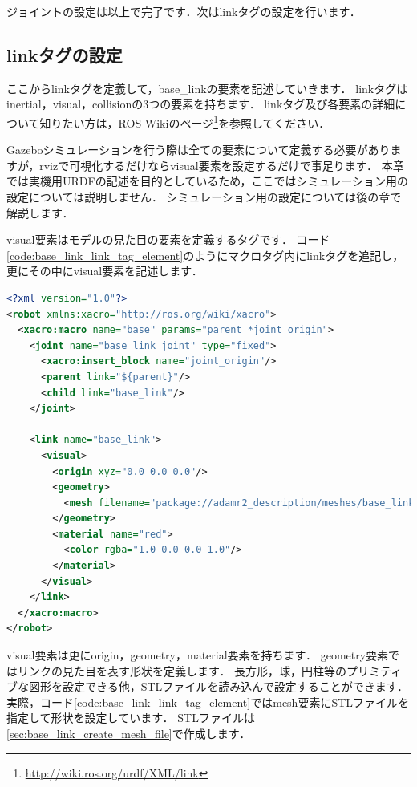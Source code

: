 \documentclass[{../../master}]{subfiles}
\begin{document}
ジョイントの設定は以上で完了です．次は\textsf{link}タグの設定を行います．

\subsection{\textsf{link}タグの設定}
\label{sec:base_link_define_link_tag}

ここから\textsf{link}タグを定義して，\textsf{base\_link}の要素を記述していきます．
\textsf{link}タグは\textsf{inertial}，\textsf{visual}，\textsf{collision}の3つの要素を持ちます．
\textsf{link}タグ及び各要素の詳細について知りたい方は，ROS Wikiのページ\footnote{\url{http://wiki.ros.org/urdf/XML/link}}を参照してください．

Gazeboシミュレーションを行う際は全ての要素について定義する必要がありますが，\textsf{rviz}で可視化するだけなら\textsf{visual}要素を設定するだけで事足ります．
本章では実機用URDFの記述を目的としているため，ここではシミュレーション用の設定については説明しません．
シミュレーション用の設定については後の章で解説します．

\textsf{visual}要素はモデルの見た目の要素を定義するタグです．
コード\ref{code:base_link_link_tag_element}のようにマクロタグ内に\textsf{link}タグを追記し，更にその中に\textsf{visual}要素を記述します．

\begin{lstlisting}[language=XML, caption=\textsf{link} Element, label=code:base_link_link_tag_element]
<?xml version="1.0"?>
<robot xmlns:xacro="http://ros.org/wiki/xacro">
  <xacro:macro name="base" params="parent *joint_origin">
    <joint name="base_link_joint" type="fixed">
      <xacro:insert_block name="joint_origin"/>
      <parent link="${parent}"/>
      <child link="base_link"/>
    </joint>

    <link name="base_link">
      <visual>
        <origin xyz="0.0 0.0 0.0"/>
        <geometry>
          <mesh filename="package://adamr2_description/meshes/base_link.STL"/>
        </geometry>
        <material name="red">
          <color rgba="1.0 0.0 0.0 1.0"/>
        </material>
      </visual>
    </link>
  </xacro:macro>
</robot>
\end{lstlisting}

\textsf{visual}要素は更に\textsf{origin}，\textsf{geometry}，\textsf{material}要素を持ちます．
\textsf{geometry}要素ではリンクの見た目を表す形状を定義します．
長方形，球，円柱等のプリミティブな図形を設定できる他，STLファイルを読み込んで設定することができます．
実際，コード\ref{code:base_link_link_tag_element}では\textsf{mesh}要素にSTLファイルを指定して形状を設定しています．
STLファイルは\ref{sec:base_link_create_mesh_file}で作成します．
\end{document}
